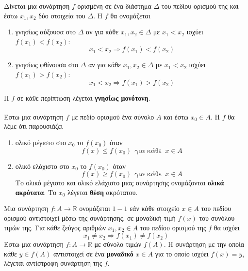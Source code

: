 \documentclass[ektypwsh]{frontisthrio}
\begin{document}
Δίνεται μια συνάρτηση $ f $ ορισμένη σε ένα διάστημα $ \Delta $ του πεδίου ορισμού της και έστω $ x_1,x_2 $ δύο στοιχεία του $ \Delta $. Η $ f $ θα ονομάζεται
\begin{enumerate}
\item γνησίως αύξουσα στο $\Delta $ αν για κάθε $ x_1,x_2\in\Delta $ με $ x_1<x_2 $ ισχύει $ f(x_1)<f(x_2) $:
\[ x_1<x_2\Rightarrow f(x_1)<f(x_2) \]
\item γνησίως φθίνουσα στο $\Delta $ αν για κάθε $ x_1,x_2\in\Delta $ με $ x_1<x_2 $ ισχύει $ f(x_1)>f(x_2) $:
\[ x_1<x_2\Rightarrow f(x_1)>f(x_2) \]
\end{enumerate}
Η $ f $ σε κάθε περίπτωση λέγεται \textbf{γνησίως μονότονη}.\\\\
Έστω μια συνάρτηση $ f $ με πεδίο ορισμού ένα σύνολο $ A $ και έστω $ x_0\in A $. Η $ f $ θα λέμε ότι παρουσιάζει
\begin{enumerate}
\item ολικό μέγιστο στο $ x_0 $ το $ f(x_0) $ όταν 
\[ f(x)\leq f(x_0)\ \ \textrm{για κάθε}\ \ x\in A \]
\item ολικό ελάχιστο στο $ x_0 $ το $ f(x_0) $ όταν 
\[ f(x)\geq f(x_0)\ \ \textrm{για κάθε}\ \ x\in A \]
Το ολικό μέγιστο και ολικό ελάχιστο μιας συνάρτησης ονομάζονται \textbf{ολικά ακρότατα}. Το $ x_0 $ λέγεται \textbf{θέση} ακρότατου.
\end{enumerate}
Μια συνάρτηση $ f:A\rightarrow\mathbb{R} $ ονομάζεται $ 1-1 $ εάν κάθε στοιχείο $ x\in A $ του πεδίου ορισμού αντιστοιχεί μέσω της συνάρτησης, σε μοναδική τιμή $ f(x) $ του συνόλου τιμών της. Για κάθε ζεύγος αριθμών $ x_1,x_2\in A $ του πεδίου ορισμού της $ f $ θα ισχύει \[ x_1\neq x_2\Rightarrow f(x_1)\neq f(x_2) \]
Έστω μια συνάρτηση $ f:A\to\mathbb{R} $ με σύνολο τιμών $ f(A) $. Η συνάρτηση με την οποία κάθε $ y\in f(A) $ αντιστοιχεί σε ένα \textbf{μοναδικό} $ x\in A $ για το οποίο ισχύει $ f(x)=y $, λέγεται αντίστροφη συνάρτηση της $ f $.
\begin{center}
\end{center}
\end{document}
